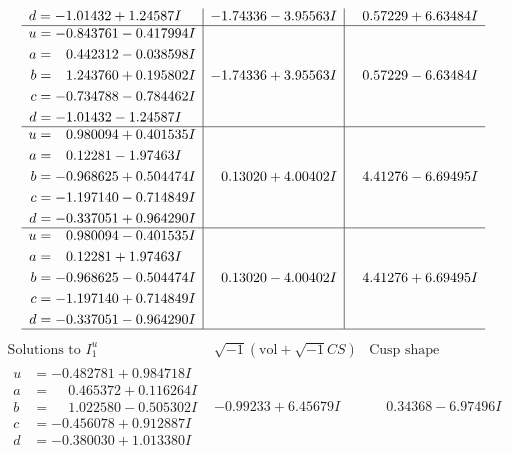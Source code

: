 \documentclass[1p]{elsarticle_modified}
\theoremstyle{definition}
\newcommand{\I}{\sqrt{-1}}
\begin{document}
$$\begin{array}{c|c|c}
\begin{aligned}
d &= -1.01432 + 1.24587 I\end{aligned}
 & -1.74336 - 3.95563 I & \phantom{-}0.57229 + 6.63484 I \\ \hline\begin{aligned}
u &= -0.843761 - 0.417994 I \\
a &= \phantom{-}0.442312 - 0.038598 I \\
b &= \phantom{-}1.243760 + 0.195802 I \\
c &= -0.734788 - 0.784462 I \\
d &= -1.01432 - 1.24587 I\end{aligned}
 & -1.74336 + 3.95563 I & \phantom{-}0.57229 - 6.63484 I \\ \hline\begin{aligned}
u &= \phantom{-}0.980094 + 0.401535 I \\
a &= \phantom{-}0.12281 - 1.97463 I \\
b &= -0.968625 + 0.504474 I \\
c &= -1.197140 - 0.714849 I \\
d &= -0.337051 + 0.964290 I\end{aligned}
 & \phantom{-}0.13020 + 4.00402 I & \phantom{-}4.41276 - 6.69495 I \\ \hline\begin{aligned}
u &= \phantom{-}0.980094 - 0.401535 I \\
a &= \phantom{-}0.12281 + 1.97463 I \\
b &= -0.968625 - 0.504474 I \\
c &= -1.197140 + 0.714849 I \\
d &= -0.337051 - 0.964290 I\end{aligned}
 & \phantom{-}0.13020 - 4.00402 I & \phantom{-}4.41276 + 6.69495 I\\
 \hline 
 \end{array}$$\newpage$$\begin{array}{c|c|c}  
\text{Solutions to }I^u_{1}& \I (\text{vol} + \sqrt{-1}CS) & \text{Cusp shape}\\
 \hline 
\begin{aligned}
u &= -0.482781 + 0.984718 I \\
a &= \phantom{-}0.465372 + 0.116264 I \\
b &= \phantom{-}1.022580 - 0.505302 I \\
c &= -0.456078 + 0.912887 I \\
d &= -0.380030 + 1.013380 I\end{aligned}
 & -0.99233 + 6.45679 I & \phantom{-}0.34368 - 6.97496 I \\ \hline\begin{aligned}

\end{aligned}
\end{array}$$
\end{document}
